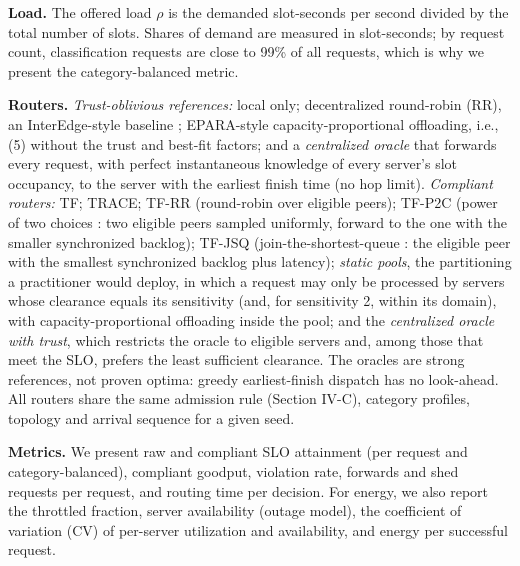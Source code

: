 \documentclass[journal]{IEEEtran}
\begin{document}
\textbf{Load.} The offered load \(\rho\) is the demanded slot-seconds per second divided by the total number of slots. Shares of demand are measured in slot-seconds; by request count, classification requests are close to 99\% of all requests, which is why we present the category-balanced metric.

\textbf{Routers.} \emph{Trust-oblivious references:} local only; decentralized round-robin (RR), an InterEdge-style baseline \cite{interedge}; EPARA-style capacity-proportional offloading, i.e., (5) without the trust and best-fit factors; and a \emph{centralized oracle} that forwards every request, with perfect instantaneous knowledge of every server's slot occupancy, to the server with the earliest finish time (no hop limit). \emph{Compliant routers:} TF; TRACE; TF-RR (round-robin over eligible peers); TF-P2C (power of two choices \cite{mitzenmacher2001two}: two eligible peers sampled uniformly, forward to the one with the smaller synchronized backlog); TF-JSQ (join-the-shortest-queue \cite{winston1977}: the eligible peer with the smallest synchronized backlog plus latency); \emph{static pools}, the partitioning a practitioner would deploy, in which a request may only be processed by servers whose clearance equals its sensitivity (and, for sensitivity 2, within its domain), with capacity-proportional offloading inside the pool; and the \emph{centralized oracle with trust}, which restricts the oracle to eligible servers and, among those that meet the SLO, prefers the least sufficient clearance. The oracles are strong references, not proven optima: greedy earliest-finish dispatch has no look-ahead. All routers share the same admission rule (Section IV-C), category profiles, topology and arrival sequence for a given seed.

\textbf{Metrics.} We present raw and compliant SLO attainment (per request and category-balanced), compliant goodput, violation rate, forwards and shed requests per request, and routing time per decision. For energy, we also report the throttled fraction, server availability (outage model), the coefficient of variation (CV) of per-server utilization and availability, and energy per successful request.
\end{document}
